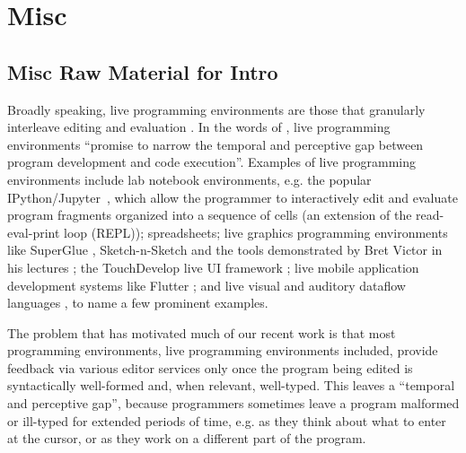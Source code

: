 \clearpage
\section{Misc}

\subsection{Misc Raw Material for Intro}


Broadly speaking, live programming environments are those that granularly interleave editing and evaluation \cite{DBLP:conf/icse/Tanimoto13,DBLP:journals/vlc/Tanimoto90,McDirmid:2007:LUL:1297027.1297073,burckhardt2013s}. 
In the words of \citet{burckhardt2013s}, live programming environments 
``promise to narrow the temporal and perceptive gap 
between program development and code execution''. Examples of live programming environments include {lab notebook environments},
e.g. the popular IPython/Jupyter~\cite{PER-GRA:2007}, which allow the
programmer to interactively edit and evaluate program fragments organized into a
sequence of cells (an extension of the read-eval-print loop (REPL)); spreadsheets; {live graphics programming environments} like SuperGlue \cite{McDirmid:2007:LUL:1297027.1297073}, Sketch-n-Sketch \cite{DBLP:conf/pldi/ChughHSA16} and the tools demonstrated by Bret Victor in his lectures \cite{victor2012inventing}; the TouchDevelop live UI framework \cite{burckhardt2013s}; live mobile application development systems like Flutter \cite{flutter}; and live visual and auditory dataflow languages \cite{DBLP:conf/vl/BurnettAW98}, to name a few prominent examples.


The problem that has motivated much of our recent work is that most  
programming environments, live programming environments included,  provide feedback via various editor services only once the program being edited is syntactically well-formed and, when relevant, well-typed. This leaves a ``temporal and perceptive gap'', because programmers sometimes leave a program malformed or ill-typed for extended periods of time, e.g. as they think about what to enter at the cursor, or as they work on a different part of the program.

